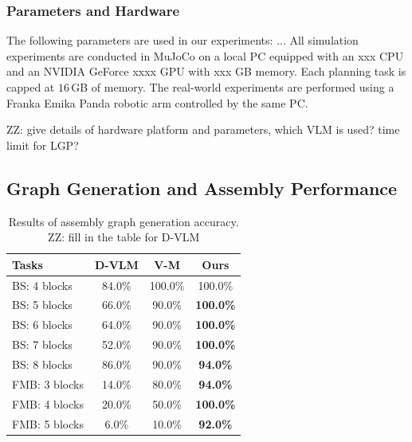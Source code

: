 \documentclass[letterpaper, 10 pt, conference]{ieeeconf}  %
\newcommand{\zz}[1]{{\color{red}ZZ: #1}}
\begin{document}

\subsubsection{Parameters and Hardware}
The following parameters are used in our experiments: ...
All simulation experiments are conducted in MuJoCo on a local PC equipped with an xxx CPU and an NVIDIA GeForce xxxx GPU with xxx GB memory. 
Each planning task is capped at $16$\,GB of memory.
The real-world experiments are performed using a Franka Emika Panda robotic arm controlled by the same PC.

\zz{give details of hardware platform and parameters, which VLM is used? time limit for LGP?}


\subsection{Graph Generation and Assembly Performance}

\begin{table}[t]
\centering
\footnotesize
\caption{Results of assembly graph generation accuracy. \zz{fill in the table for D-VLM}}
\label{tab:graph_accuracy}
\begin{tabular}{l|ccc}
\toprule
Tasks & D-VLM & V-M & Ours \\
\midrule
BS: 4 blocks & 84.0\% & 100.0\%  & 100.0\% \\
BS: 5 blocks  & 66.0\% & 90.0\% & \textbf{100.0\%} \\
BS: 6 blocks  & 64.0\% & 90.0\% & \textbf{100.0\%} \\
BS: 7 blocks  & 52.0\% & 90.0\% & \textbf{100.0\%} \\
BS: 8 blocks & 86.0\% & 90.0\% & \textbf{94.0\%} \\
\midrule
FMB: 3 blocks & 14.0\% & 80.0\% & \textbf{94.0\%}  \\
FMB: 4 blocks  & 20.0\% & 50.0\% & \textbf{100.0\%} \\
FMB: 5 blocks & \phantom{0}6.0\% & 10.0\% & \textbf{92.0\%}  \\
\bottomrule
\end{tabular}
\vspace{-5mm}
\end{table}
\end{document}
